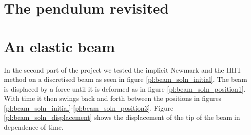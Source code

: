 \documentclass{report}
\begin{document}
\section*{The pendulum revisited}

\section*{An elastic beam}

In the second part of the project we tested the implicit Newmark and the HHT method on a discretised beam as seen in figure \ref{pl:beam_soln_initial}. The beam is displaced by a force until it is deformed as in figure \ref{pl:beam_soln_position1}. With time it then swings back and forth between the positions in figures \ref{pl:beam_soln_initial}-\ref{pl:beam_soln_position3}. Figure \ref{pl:beam_soln_displacement} shows the displacement of the tip of the beam in dependence of time.
\end{document}
